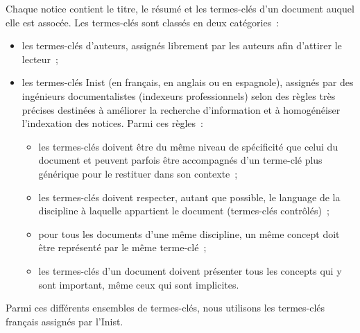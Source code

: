   Chaque notice contient le titre, le résumé et les termes-clés d'un document
  auquel elle est assocée. Les termes-clés sont classés en deux catégories~:
  \begin{itemize}
    \item{les termes-clés d'auteurs, assignés librement par les auteurs afin
          d'attirer le lecteur~;}
    \item{les termes-clés Inist (en français, en anglais ou en espagnole),
          assignés par des ingénieurs documentalistes (indexeurs professionnels)
          selon des règles très précises destinées à améliorer la recherche
          d'information et à homogénéiser l'indexation des notices. Parmi ces
          règles~:}
    \begin{itemize}
      \item{les termes-clés doivent être du même niveau de spécificité que celui
            du document et peuvent parfois être accompagnés d'un terme-clé plus
            générique pour le restituer dans son contexte~;}
      \item{les termes-clés doivent respecter, autant que possible, le language
            de la discipline à laquelle appartient le document (termes-clés
            contrôlés)~;}
      \item{pour tous les documents d'une même discipline, un même concept doit
            être représenté par le même terme-clé~;}
      \item{les termes-clés d'un document doivent présenter tous les concepts
            qui y sont important, même ceux qui sont implicites.}
    \end{itemize}
  \end{itemize}
  Parmi ces différents ensembles de termes-clés, nous utilisons les termes-clés
  français assignés par l'Inist.


